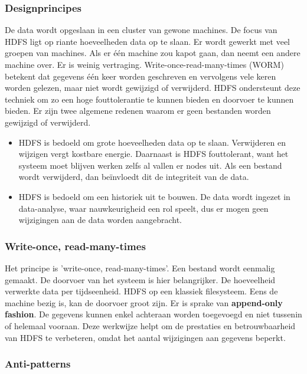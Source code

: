 \documentclass[a4paper,10pt,twoside]{report}
\begin{document}
\subsubsection{Designprincipes}

De data wordt opgeslaan in een cluster van gewone machines. De focus van HDFS ligt op riante hoeveelheden data op te slaan. Er wordt gewerkt met veel groepen van machines. Als er één machine zou kapot gaan, dan neemt een andere machine over. Er is weinig vertraging. Write-once-read-many-times (WORM) betekent dat gegevens één keer worden geschreven en vervolgens vele keren worden gelezen, maar niet wordt gewijzigd of verwijderd. HDFS ondersteunt deze techniek om zo een hoge fouttolerantie te kunnen bieden en doorvoer te kunnen bieden. Er zijn twee algemene redenen waarom er geen bestanden worden gewijzigd of verwijderd.

\begin{itemize}
	\item HDFS is bedoeld om grote hoeveelheden data op te slaan. Verwijderen en wijzigen vergt kostbare energie. Daarnaast is HDFS fouttolerant, want het systeem moet blijven werken zelfs al vallen er nodes uit. Als een bestand wordt verwijderd, dan beïnvloedt dit de integriteit van de data.
	\item HDFS is bedoeld om een historiek uit te bouwen. De data wordt ingezet in data-analyse, waar nauwkeurigheid een rol speelt, dus er mogen geen wijzigingen aan de data worden aangebracht.
\end{itemize}

\subsubsection{Write-once, read-many-times}

Het principe is 'write-once, read-many-times'. Een bestand wordt eenmalig gemaakt. De doorvoer van het systeem is hier belangrijker. De hoeveelheid verwerkte data per tijdseenheid. HDFS op een klassiek filesysteem. Eens de machine bezig is, kan de doorvoer groot zijn. Er is sprake van \textbf{append-only fashion}. De gegevens kunnen enkel achteraan worden toegevoegd en niet tussenin of helemaal vooraan. Deze werkwijze helpt om de prestaties en betrouwbaarheid van HDFS te verbeteren, omdat het aantal wijzigingen aan gegevens beperkt. 

\subsubsection{Anti-patterns}
\end{document}
